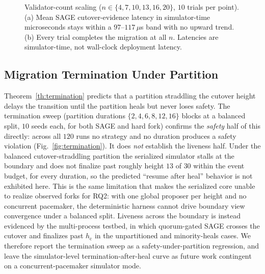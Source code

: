 \documentclass[journal]{IEEEtran}
\begin{document}
\begin{figure}[t]
\centering
{}
\caption{Validator-count scaling ($n\in\{4,7,10,13,16,20\}$, $10$ trials per point).
(a) Mean SAGE cutover-evidence latency in simulator-time microseconds stays within a $97$--$117\,\mu$s
band with no upward trend. (b) Every trial completes the migration at all $n$. Latencies are
simulator-time, not wall-clock deployment latency.}
\label{fig:scaling}
\end{figure}

\subsection{Migration Termination Under Partition}
Theorem~\ref{th:termination} predicts that a partition straddling the cutover height delays
the transition until the partition heals but never loses safety. The termination
sweep (partition durations $\{2,4,6,8,12,16\}$ blocks at a
balanced split, $10$ seeds each, for both SAGE and hard fork) confirms the \emph{safety} half of
this directly: across all $120$ runs no strategy and no duration produces a safety violation
(Fig.~\ref{fig:termination}). It does \emph{not} establish the liveness half. Under the balanced
cutover-straddling partition the serialized simulator stalls at the boundary and does not finalize
past roughly height $13$ of $30$ within the event budget, for every duration, so the predicted
``resume after heal'' behavior is not exhibited here. This is the same limitation that makes the
serialized core unable to realize observed forks for RQ2: with one global proposer per height and
no concurrent pacemaker, the deterministic harness cannot drive boundary view convergence under a
balanced split. Liveness across the boundary is instead evidenced by the multi-process testbed,
in which quorum-gated SAGE crosses the cutover and finalizes past $h_{\mathrm{c}}$ in the
unpartitioned and minority-heals cases. We therefore report the termination sweep as a
safety-under-partition regression, and leave the simulator-level termination-after-heal curve as
future work contingent on a concurrent-pacemaker simulator mode.
\end{document}
